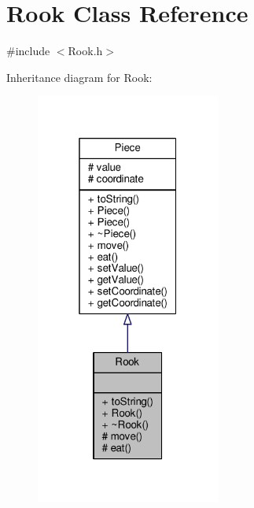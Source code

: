 \hypertarget{class_rook}{}\section{Rook Class Reference}
\label{class_rook}


{\ttfamily \#include $<$Rook.\+h$>$}



Inheritance diagram for Rook\+:
\nopagebreak
\begin{figure}[H]
\begin{center}
\leavevmode
\includegraphics[width=172pt]{class_rook__inherit__graph}
\end{center}
\end{figure}


